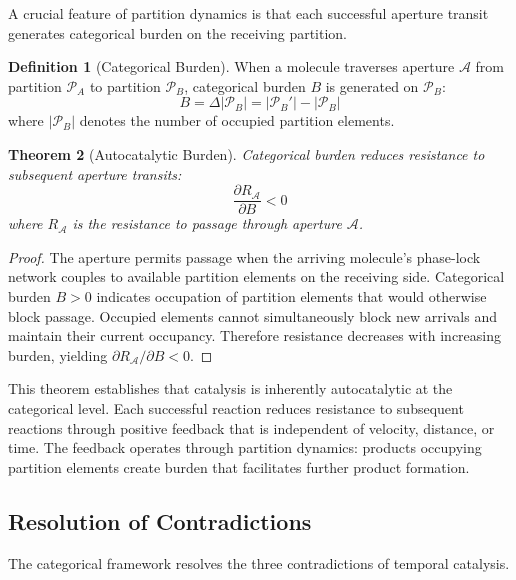 \documentclass[twocolumn,10pt,a4paper]{article}
\newtheorem{theorem}{Theorem}[section]
\theoremstyle{definition}
\newtheorem{definition}[theorem]{Definition}
\theoremstyle{remark}
\newcommand{\partition}{\mathcal{P}}
\newcommand{\aperture}{\mathcal{A}}
\begin{document}
A crucial feature of partition dynamics is that each successful aperture transit generates categorical burden on the receiving partition.

\begin{definition}[Categorical Burden]
\label{def:burden}
When a molecule traverses aperture $\aperture$ from partition $\partition_A$ to partition $\partition_B$, categorical burden $B$ is generated on $\partition_B$:
\begin{equation}
B = \Delta|\partition_B| = |\partition_B'| - |\partition_B|
\end{equation}
where $|\partition_B|$ denotes the number of occupied partition elements.
\end{definition}

\begin{theorem}[Autocatalytic Burden]
\label{thm:autocatalysis}
Categorical burden reduces resistance to subsequent aperture transits:
\begin{equation}
\frac{\partial R_{\aperture}}{\partial B} < 0
\end{equation}
where $R_{\aperture}$ is the resistance to passage through aperture $\aperture$.
\end{theorem}

\begin{proof}
The aperture permits passage when the arriving molecule's phase-lock network couples to available partition elements on the receiving side. Categorical burden $B > 0$ indicates occupation of partition elements that would otherwise block passage. Occupied elements cannot simultaneously block new arrivals and maintain their current occupancy. Therefore resistance decreases with increasing burden, yielding $\partial R_{\aperture}/\partial B < 0$.
\end{proof}

This theorem establishes that catalysis is inherently autocatalytic at the categorical level. Each successful reaction reduces resistance to subsequent reactions through positive feedback that is independent of velocity, distance, or time. The feedback operates through partition dynamics: products occupying partition elements create burden that facilitates further product formation.

\subsection{Resolution of Contradictions}

The categorical framework resolves the three contradictions of temporal catalysis.
\end{document}

